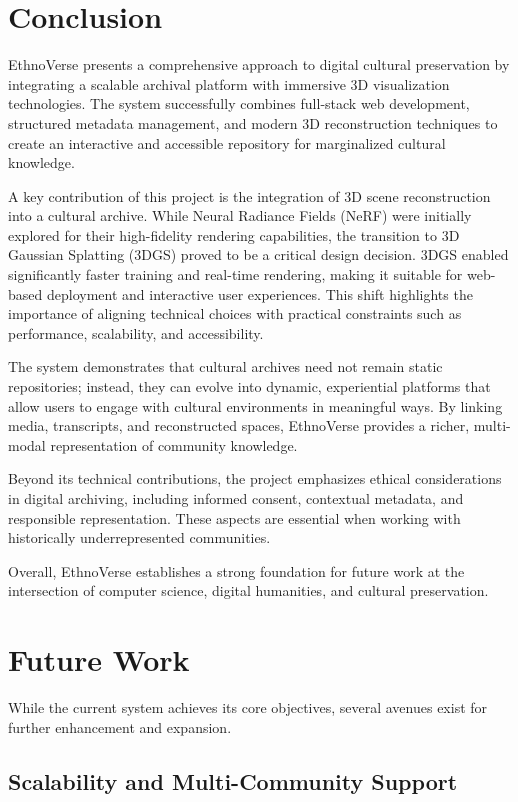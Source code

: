 \section{Conclusion}

EthnoVerse presents a comprehensive approach to digital cultural preservation by integrating a scalable archival platform with immersive 3D visualization technologies. The system successfully combines full-stack web development, structured metadata management, and modern 3D reconstruction techniques to create an interactive and accessible repository for marginalized cultural knowledge.

A key contribution of this project is the integration of 3D scene reconstruction into a cultural archive. While Neural Radiance Fields (NeRF) were initially explored for their high-fidelity rendering capabilities, the transition to 3D Gaussian Splatting (3DGS) proved to be a critical design decision. 3DGS enabled significantly faster training and real-time rendering, making it suitable for web-based deployment and interactive user experiences. This shift highlights the importance of aligning technical choices with practical constraints such as performance, scalability, and accessibility.

The system demonstrates that cultural archives need not remain static repositories; instead, they can evolve into dynamic, experiential platforms that allow users to engage with cultural environments in meaningful ways. By linking media, transcripts, and reconstructed spaces, EthnoVerse provides a richer, multi-modal representation of community knowledge.

Beyond its technical contributions, the project emphasizes ethical considerations in digital archiving, including informed consent, contextual metadata, and responsible representation. These aspects are essential when working with historically underrepresented communities.

Overall, EthnoVerse establishes a strong foundation for future work at the intersection of computer science, digital humanities, and cultural preservation.

\section{Future Work}

While the current system achieves its core objectives, several avenues exist for further enhancement and expansion.

\subsection{Scalability and Multi-Community Support}

